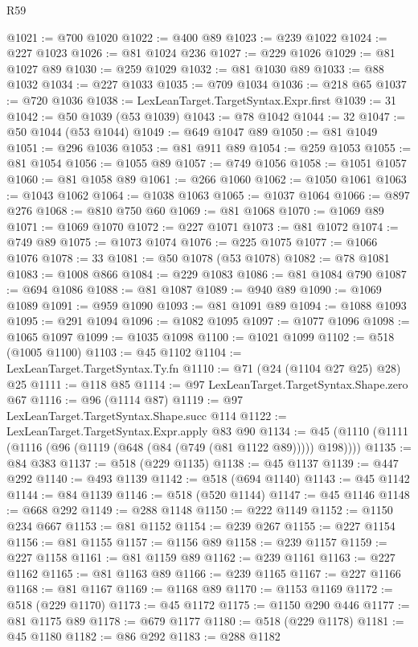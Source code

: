\begin{lexlean}{R59}
\begin{coremodule}
@1021 := @700 @1020
@1022 := @400 @89
@1023 := @239 @1022
@1024 := @227 @1023
@1026 := @81 @1024 @236
@1027 := @229 @1026
@1029 := @81 @1027 @89
@1030 := @259 @1029
@1032 := @81 @1030 @89
@1033 := @88 @1032
@1034 := @227 @1033
@1035 := @709 @1034
@1036 := @218 @65
@1037 := @720 @1036
@1038 := LexLeanTarget.TargetSyntax.Expr.first
@1039 := 31
@1042 := @50 @1039 (@53 @1039)
@1043 := @78 @1042
@1044 := 32
@1047 := @50 @1044 (@53 @1044)
@1049 := @649 @1047 @89
@1050 := @81 @1049
@1051 := @296 @1036
@1053 := @81 @911 @89
@1054 := @259 @1053
@1055 := @81 @1054
@1056 := @1055 @89
@1057 := @749 @1056
@1058 := @1051 @1057
@1060 := @81 @1058 @89
@1061 := @266 @1060
@1062 := @1050 @1061
@1063 := @1043 @1062
@1064 := @1038 @1063
@1065 := @1037 @1064
@1066 := @897 @276
@1068 := @810 @750 @60
@1069 := @81 @1068
@1070 := @1069 @89
@1071 := @1069 @1070
@1072 := @227 @1071
@1073 := @81 @1072
@1074 := @749 @89
@1075 := @1073 @1074
@1076 := @225 @1075
@1077 := @1066 @1076
@1078 := 33
@1081 := @50 @1078 (@53 @1078)
@1082 := @78 @1081
@1083 := @1008 @866
@1084 := @229 @1083
@1086 := @81 @1084 @790
@1087 := @694 @1086
@1088 := @81 @1087
@1089 := @940 @89
@1090 := @1069 @1089
@1091 := @959 @1090
@1093 := @81 @1091 @89
@1094 := @1088 @1093
@1095 := @291 @1094
@1096 := @1082 @1095
@1097 := @1077 @1096
@1098 := @1065 @1097
@1099 := @1035 @1098
@1100 := @1021 @1099
@1102 := @518 (@1005 @1100)
@1103 := @45 @1102
@1104 := LexLeanTarget.TargetSyntax.Ty.fn
@1110 := @71 (@24 (@1104 @27 @25) @28) @25
@1111 := @118 @85
@1114 := @97 LexLeanTarget.TargetSyntax.Shape.zero @67
@1116 := @96 (@1114 @87)
@1119 := @97 LexLeanTarget.TargetSyntax.Shape.succ @114
@1122 := LexLeanTarget.TargetSyntax.Expr.apply @83 @90
@1134 := @45 (@1110 (@1111 (@1116 (@96 (@1119 (@648 (@84 (@749 (@81 @1122 @89))))) @198))))
@1135 := @84 @383
@1137 := @518 (@229 @1135)
@1138 := @45 @1137
@1139 := @447 @292
@1140 := @493 @1139
@1142 := @518 (@694 @1140)
@1143 := @45 @1142
@1144 := @84 @1139
@1146 := @518 (@520 @1144)
@1147 := @45 @1146
@1148 := @668 @292
@1149 := @288 @1148
@1150 := @222 @1149
@1152 := @1150 @234 @667
@1153 := @81 @1152
@1154 := @239 @267
@1155 := @227 @1154
@1156 := @81 @1155
@1157 := @1156 @89
@1158 := @239 @1157
@1159 := @227 @1158
@1161 := @81 @1159 @89
@1162 := @239 @1161
@1163 := @227 @1162
@1165 := @81 @1163 @89
@1166 := @239 @1165
@1167 := @227 @1166
@1168 := @81 @1167
@1169 := @1168 @89
@1170 := @1153 @1169
@1172 := @518 (@229 @1170)
@1173 := @45 @1172
@1175 := @1150 @290 @446
@1177 := @81 @1175 @89
@1178 := @679 @1177
@1180 := @518 (@229 @1178)
@1181 := @45 @1180
@1182 := @86 @292
@1183 := @288 @1182

\end{coremodule}
\end{lexlean}
